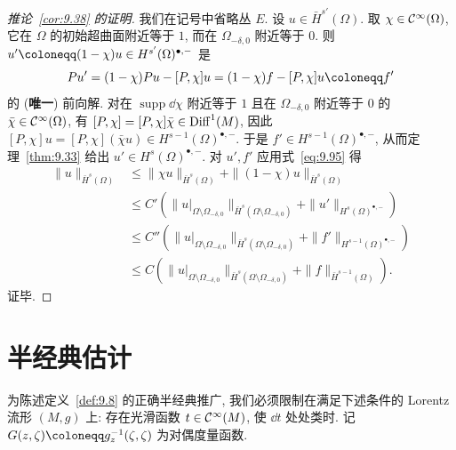 \begin{proof}[推论~\ref{cor:9.38} 的证明]
我们在记号中省略丛 $E$. 设 $u \in \bar{H}^{s'}(\Omega)$. 取 $\chi \in \mathcal{C}^\infty(\Omega)$, 它在 $\Omega$ 的初始超曲面附近等于 $1$, 而在 $\Omega_{-\delta,0}$ 附近等于 $0$. 则 $u' \defeq (1 - \chi) u \in H^{s'}(\Omega)^{\bullet,-}$ 是
\begin{equation}\label{eq:9.117}
    P u' = (1 - \chi) P u - [P, \chi] u = (1 - \chi) f - [P, \chi] u \defeq f'
\end{equation}
的 (\textbf{唯一}) 前向解. 对在 $\operatorname{supp} \dd \chi$ 附近等于 $1$ 且在 $\Omega_{-\delta,0}$ 附近等于 $0$ 的 $\bar{\chi} \in \mathcal{C}^\infty(\Omega)$, 有 $[P, \chi] = [P, \chi]\bar{\chi} \in \operatorname{Diff}^1(M)$, 因此 $[P, \chi] u = [P, \chi](\bar{\chi} u) \in H^{s-1}(\Omega)^{\bullet,-}$. 于是 $f' \in H^{s-1}(\Omega)^{\bullet,-}$, 从而定理~\ref{thm:9.33} 给出 $u' \in H^s(\Omega)^{\bullet,-}$. 对 $u', f'$ 应用式~\eqref{eq:9.95} 得
\begin{equation*}
    \begin{aligned}
        \|u\|_{\bar{H}^s(\Omega)} &\le \|\chi u\|_{\bar{H}^s(\Omega)} + \|(1 - \chi) u\|_{\bar{H}^s(\Omega)} \\
        &\le C' \left( \|u|_{\Omega \setminus \Omega_{-\delta,0}}\|_{\bar{H}^s(\Omega \setminus \Omega_{-\delta,0})} + \|u'\|_{H^s(\Omega)^{\bullet,-}} \right) \\
        &\le C'' \left( \|u|_{\Omega \setminus \Omega_{-\delta,0}}\|_{\bar{H}^s(\Omega \setminus \Omega_{-\delta,0})} + \|f'\|_{H^{s-1}(\Omega)^{\bullet,-}} \right) \\
        &\le C \left( \|u|_{\Omega \setminus \Omega_{-\delta,0}}\|_{\bar{H}^s(\Omega \setminus \Omega_{-\delta,0})} + \|f\|_{\bar{H}^{s-1}(\Omega)} \right).
    \end{aligned}
\end{equation*}
证毕.
\end{proof}

\section{半经典估计}\label{sec:9.5}
%
%

为陈述定义~\ref{def:9.8} 的正确半经典推广, 我们必须限制在满足下述条件的 Lorentz 流形 $(M, g)$ 上: 存在光滑函数 $t \in \mathcal{C}^\infty(M)$, 使 $\dd t$ 处处类时. 记 $G(z, \zeta) \defeq g_z^{-1}(\zeta, \zeta)$ 为对偶度量函数.

